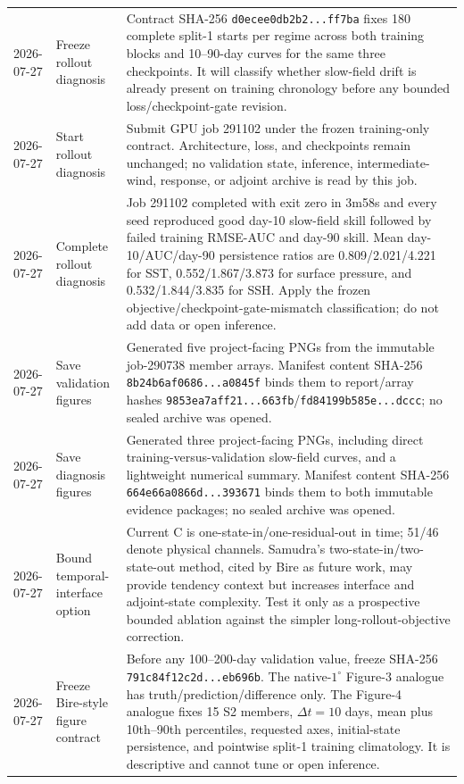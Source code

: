 \documentclass[11pt]{article}
\begin{document}
\begin{longtable}{@{}p{}p{}p{}@{}}
2026-07-27 & Freeze rollout diagnosis & Contract SHA-256 \texttt{d0ecee0db2b2...ff7ba} fixes 180 complete split-1 starts per regime across both training blocks and 10--90-day curves for the same three checkpoints.  It will classify whether slow-field drift is already present on training chronology before any bounded loss/checkpoint-gate revision. \\
2026-07-27 & Start rollout diagnosis & Submit GPU job 291102 under the frozen training-only contract.  Architecture, loss, and checkpoints remain unchanged; no validation state, inference, intermediate-wind, response, or adjoint archive is read by this job. \\
2026-07-27 & Complete rollout diagnosis & Job 291102 completed with exit zero in 3m58s and every seed reproduced good day-10 slow-field skill followed by failed training RMSE-AUC and day-90 skill.  Mean day-10/AUC/day-90 persistence ratios are 0.809/2.021/4.221 for SST, 0.552/1.867/3.873 for surface pressure, and 0.532/1.844/3.835 for SSH.  Apply the frozen objective/checkpoint-gate-mismatch classification; do not add data or open inference. \\
2026-07-27 & Save validation figures & Generated five project-facing PNGs from the immutable job-290738 member arrays.  Manifest content SHA-256 \texttt{8b24b6af0686...a0845f} binds them to report/array hashes \texttt{9853ea7aff21...663fb}/\texttt{fd84199b585e...dccc}; no sealed archive was opened. \\
2026-07-27 & Save diagnosis figures & Generated three project-facing PNGs, including direct training-versus-validation slow-field curves, and a lightweight numerical summary.  Manifest content SHA-256 \texttt{664e66a0866d...393671} binds them to both immutable evidence packages; no sealed archive was opened. \\
2026-07-27 & Bound temporal-interface option & Current C is one-state-in/one-residual-out in time; 51/46 denote physical channels.  Samudra's two-state-in/two-state-out method, cited by Bire as future work, may provide tendency context but increases interface and adjoint-state complexity.  Test it only as a prospective bounded ablation against the simpler long-rollout-objective correction. \\
2026-07-27 & Freeze Bire-style figure contract & Before any 100--200-day validation value, freeze SHA-256 \texttt{791c84f12c2d...eb696b}.  The native-\(1^\circ\) Figure-3 analogue has truth/prediction/difference only.  The Figure-4 analogue fixes 15 S2 members, \(\Delta t=10\) days, mean plus 10th--90th percentiles, requested axes, initial-state persistence, and pointwise split-1 training climatology.  It is descriptive and cannot tune or open inference. \\

\end{longtable}
\end{document}
